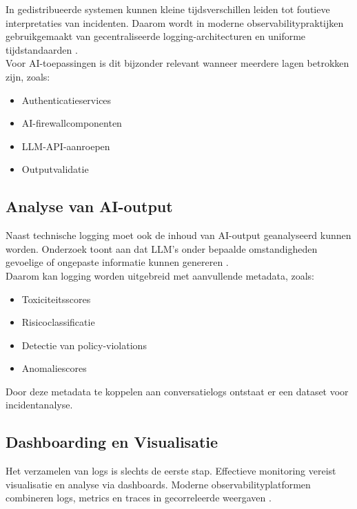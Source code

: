 In gedistribueerde systemen kunnen kleine tijdsverschillen leiden tot foutieve interpretaties van incidenten. Daarom wordt in moderne observabilitypraktijken gebruikgemaakt van gecentraliseerde logging-architecturen en uniforme tijdstandaarden \autocite{ganesan2022observability}.\\

Voor AI-toepassingen is dit bijzonder relevant wanneer meerdere lagen betrokken zijn, zoals:

\begin{itemize}
    \item Authenticatieservices
    \item AI-firewallcomponenten
    \item LLM-API-aanroepen
    \item Outputvalidatie
\end{itemize}

\subsection{Analyse van AI-output}

Naast technische logging moet ook de inhoud van AI-output geanalyseerd kunnen worden. Onderzoek toont aan dat LLM’s onder bepaalde omstandigheden gevoelige of ongepaste informatie kunnen genereren \autocite{gehman2020realtoxicity}.\\

Daarom kan logging worden uitgebreid met aanvullende metadata, zoals:

\begin{itemize}
    \item Toxiciteitsscores
    \item Risicoclassificatie
    \item Detectie van policy-violations
    \item Anomaliescores
\end{itemize}

Door deze metadata te koppelen aan conversatielogs ontstaat er een dataset voor incidentanalyse.

\subsection{Dashboarding en Visualisatie}

Het verzamelen van logs is slechts de eerste stap. Effectieve monitoring vereist visualisatie en analyse via dashboards. Moderne observabilityplatformen combineren logs, metrics en traces in gecorreleerde weergaven \autocite{ganesan2022observability}.

